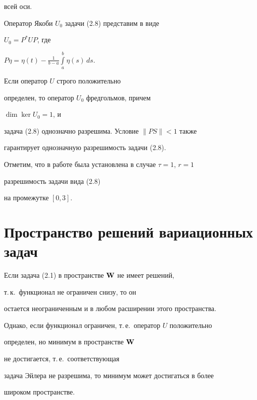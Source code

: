 \begin{exam}
всей оси.


Оператор Якоби $U_0$ задачи (2.8) представим в виде


$U_0=P^*UP$, где


$P\eta=\eta(t)-\frac{1}{b-a}\int\limits_a^b\eta(s)\,ds$.


Если оператор $U$ строго положительно


определен, то оператор $U_0$ фредгольмов, причем


$\dim\ker U_0=1$, и


задача (2.8) однозначно разрешима. Условие $\|PS\|<1$ также


гарантирует однозначную разрешимость задачи (2.8).


Отметим, что в работе \cite{KS} была установлена в случае $\tau=1$, $r=1$


разрешимость задачи вида (2.8)


на промежутке $[0,3]$.


\end{exam}





\section{Пространство решений вариационных задач}





Если задача (2.1) в пространстве $\bold W{}$ не имеет решений,


т.\,к.~функционал не ограничен снизу, то он


остается неограниченным и в любом расширении этого пространства.


Однако, если функционал ограничен, т.\,е.~оператор $U$ положительно


определен, но минимум в пространстве $\bold W{}$


не достигается, т.\,е.~соответствующая


задача Эйлера не разрешима, то минимум может достигаться в более


широком пространстве.





